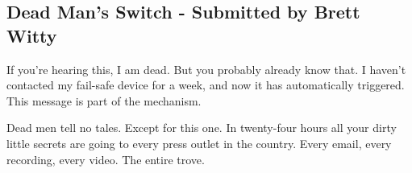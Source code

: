 \documentclass[12pt, a5paper, parskip=half-, footheight=1.4cm]{scrartcl}
\begin{document}
%
%
%
%
%
%

\subsection*{Dead Man's Switch  \setmainfont{URWClassico} - Submitted by Brett Witty} \label{subsection:dead-mans-switch}
If you're hearing this, I am dead.
But you probably already know that.
I haven't contacted my fail-safe device for a week, and now it has automatically triggered.
This message is part of the mechanism.

Dead men tell no tales.
Except for this one. 
In twenty-four hours all your dirty little secrets are going to every press outlet in the country. 
Every email, every recording, every video. 
The entire trove.
\end{document}
